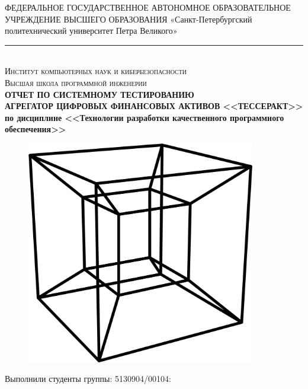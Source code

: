 \documentclass[a4paper, 14pt]{article}
\begin{document}
\begin{titlepage}
    \center

    ФЕДЕРАЛЬНОЕ ГОСУДАРСТВЕННОЕ АВТОНОМНОЕ ОБРАЗОВАТЕЛЬНОЕ УЧРЕЖДЕНИЕ ВЫСШЕГО ОБРАЗОВАНИЯ\linebreak
    «Санкт-Петербургский политехнический университет Петра Великого»
    \noindent\rule{500pt}{0.8pt} \\
    \textsc{\Large Институт компьютерных наук и кибербезопасности}\\
    \textsc{\large Высшая школа программной инженерии}\\[1.5cm]

    { \huge \bfseries ОТЧЕТ ПО СИСТЕМНОМУ ТЕСТИРОВАНИЮ	\\
    \Large \mdseries АГРЕГАТОР ЦИФРОВЫХ ФИНАНСОВЫХ АКТИВОВ <<ТЕССЕРАКТ>> \\
    \large по дисциплине <<Технологии разработки качественного программного обеспечения>>}\\
    \flushright{
        {\phantom{qwe}}\\[1.0cm]
    }

    \begin{figure}[H]
        \centering
        \includegraphics[width=10cm]{./resources/1.png}\\[2.0cm]
    \end{figure}

    \begin{multicols}{2}
        \begin{flushright} \large

            {Выполнили студенты группы: 5130904/00104:}\\
            {\phantom{qwe}}\\
            {\phantom{qwe}}\\
            {\phantom{qwe}}\\
            {\phantom{qwe}}\\


\end{flushright}
\end{multicols}
\end{titlepage}
\end{document}
